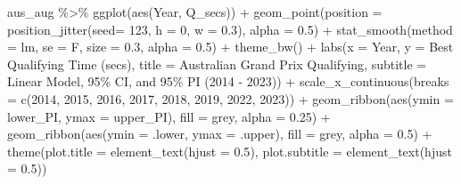 \documentclass[
]{book}
\newenvironment{Shaded}{\begin{snugshade}}{\end{snugshade}}
\newcommand{\AttributeTok}[1]{\textcolor[rgb]{0.77,0.63,0.00}{#1}}
\newcommand{\DecValTok}[1]{\textcolor[rgb]{0.00,0.00,0.81}{#1}}
\newcommand{\FloatTok}[1]{\textcolor[rgb]{0.00,0.00,0.81}{#1}}
\newcommand{\FunctionTok}[1]{\textcolor[rgb]{0.00,0.00,0.00}{#1}}
\newcommand{\NormalTok}[1]{#1}
\newcommand{\SpecialCharTok}[1]{\textcolor[rgb]{0.00,0.00,0.00}{#1}}
\newcommand{\StringTok}[1]{\textcolor[rgb]{0.31,0.60,0.02}{#1}}
\begin{document}
\begin{Shaded}
\begin{Highlighting}[]
\NormalTok{aus\_aug }\SpecialCharTok{\%\textgreater{}\%} 
  \FunctionTok{ggplot}\NormalTok{(}\FunctionTok{aes}\NormalTok{(Year, Q\_secs)) }\SpecialCharTok{+}
  \FunctionTok{geom\_point}\NormalTok{(}\AttributeTok{position =} \FunctionTok{position\_jitter}\NormalTok{(}\AttributeTok{seed=} \DecValTok{123}\NormalTok{, }\AttributeTok{h =} \DecValTok{0}\NormalTok{, }\AttributeTok{w =} \FloatTok{0.3}\NormalTok{), }\AttributeTok{alpha =} \FloatTok{0.5}\NormalTok{) }\SpecialCharTok{+}
  \FunctionTok{stat\_smooth}\NormalTok{(}\AttributeTok{method =} \StringTok{\textquotesingle{}lm\textquotesingle{}}\NormalTok{, }\AttributeTok{se =}\NormalTok{ F, }\AttributeTok{size =} \FloatTok{0.3}\NormalTok{, }\AttributeTok{alpha =} \FloatTok{0.5}\NormalTok{) }\SpecialCharTok{+} 
  \FunctionTok{theme\_bw}\NormalTok{() }\SpecialCharTok{+}
  \FunctionTok{labs}\NormalTok{(}\AttributeTok{x =} \StringTok{\textquotesingle{}Year\textquotesingle{}}\NormalTok{,}
       \AttributeTok{y =} \StringTok{\textquotesingle{}Best Qualifying Time (secs)\textquotesingle{}}\NormalTok{,}
       \AttributeTok{title =} \StringTok{\textquotesingle{}Australian Grand Prix Qualifying\textquotesingle{}}\NormalTok{,}
       \AttributeTok{subtitle =} \StringTok{\textquotesingle{}Linear Model, 95\% CI, and 95\% PI (2014 {-} 2023)\textquotesingle{}}\NormalTok{) }\SpecialCharTok{+}
  \FunctionTok{scale\_x\_continuous}\NormalTok{(}\AttributeTok{breaks =} \FunctionTok{c}\NormalTok{(}\DecValTok{2014}\NormalTok{, }\DecValTok{2015}\NormalTok{, }\DecValTok{2016}\NormalTok{, }\DecValTok{2017}\NormalTok{, }\DecValTok{2018}\NormalTok{, }\DecValTok{2019}\NormalTok{, }\DecValTok{2022}\NormalTok{, }\DecValTok{2023}\NormalTok{)) }\SpecialCharTok{+}
  \FunctionTok{geom\_ribbon}\NormalTok{(}\FunctionTok{aes}\NormalTok{(}\AttributeTok{ymin =}\NormalTok{ lower\_PI, }\AttributeTok{ymax =}\NormalTok{ upper\_PI), }\AttributeTok{fill =} \StringTok{\textquotesingle{}grey\textquotesingle{}}\NormalTok{, }\AttributeTok{alpha =} \FloatTok{0.25}\NormalTok{) }\SpecialCharTok{+}
  \FunctionTok{geom\_ribbon}\NormalTok{(}\FunctionTok{aes}\NormalTok{(}\AttributeTok{ymin =}\NormalTok{ .lower, }\AttributeTok{ymax =}\NormalTok{ .upper), }\AttributeTok{fill =} \StringTok{\textquotesingle{}grey\textquotesingle{}}\NormalTok{, }\AttributeTok{alpha =} \FloatTok{0.5}\NormalTok{) }\SpecialCharTok{+}
  \FunctionTok{theme}\NormalTok{(}\AttributeTok{plot.title =} \FunctionTok{element\_text}\NormalTok{(}\AttributeTok{hjust =} \FloatTok{0.5}\NormalTok{),}
        \AttributeTok{plot.subtitle =} \FunctionTok{element\_text}\NormalTok{(}\AttributeTok{hjust =} \FloatTok{0.5}\NormalTok{))}
\end{Highlighting}
\end{Shaded}
\end{document}
